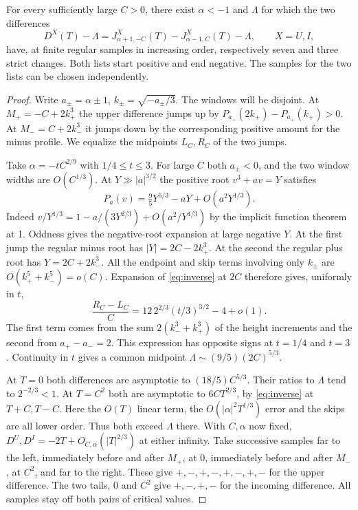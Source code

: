 \begin{lemma}\label{lem:skew-cubic}
For every sufficiently large $C>0$, there exist $\alpha<-1$ and $\Lambda$
for which the two differences
\[
 D^X(T)-\Lambda
 =J^X_{\alpha+1,-C}(T)-J^X_{\alpha-1,C}(T)-\Lambda,\qquad X=U,I,
\]
have, at finite regular samples in increasing order, respectively seven
and three strict changes. Both lists start positive and end negative.
The samples for the two lists can be chosen independently.
\end{lemma}
\begin{proof}
Write $a_\pm=\alpha\pm1$, $k_\pm=\sqrt{-a_\pm/3}$. The windows will be
disjoint. At $M_+=-C+2k_+^3$ the upper difference jumps up by
$P_{a_+}(2k_+)-P_{a_+}(k_+)>0$. At $M_-=C+2k_-^3$ it jumps down by
the corresponding positive amount for the minus profile. We equalize the
midpoints $L_C,R_C$ of the two jumps.

Take $\alpha=-t C^{2/9}$ with $1/4\le t\le3$. For large $C$ both
$a_\pm<0$, and the two window widths are $O(C^{1/3})$. At $Y\gg|a|^{3/2}$
the positive root $v^3+av=Y$ satisfies
\begin{equation}
 P_a(v)=\tfrac95Y^{5/3}-aY+O(a^2Y^{1/3}).                     \label{eq:inverse}
\end{equation}
Indeed $v/Y^{1/3}=1-a/(3Y^{2/3})+O(a^2/Y^{4/3})$ by the implicit
function theorem at 1. Oddness gives the negative-root expansion at
large negative $Y$. At the first jump the regular minus root has
$|Y|=2C-2k_+^3$. At the second the regular plus root has
$Y=2C+2k_-^3$. All the endpoint and skip terms involving only $k_\pm$
are $O(k_+^5+k_-^5)=o(C)$. Expansion of \eqref{eq:inverse} at $2C$
therefore gives, uniformly in $t$,
\[
 \frac{R_C-L_C}{C}=
 12\,2^{2/3}(t/3)^{3/2}-4+o(1).
\]
The first term comes from the sum $2(k_-^3+k_+^3)$ of the height
increments and the second from $a_+-a_-=2$. This expression has opposite
signs at $t=1/4$ and $t=3$. Continuity in $t$ gives a common midpoint
$\Lambda\sim(9/5)(2C)^{5/3}$.

At $T=0$ both differences are asymptotic to $(18/5)C^{5/3}$. Their
ratios to $\Lambda$ tend to $2^{-2/3}<1$.
At $T=C^2$ both are asymptotic to $6CT^{2/3}$, by
\eqref{eq:inverse} at $T+C,T-C$. Here the $O(T)$ linear term, the
$O(|\alpha|^2T^{1/3})$ error and the skips are all lower order.
Thus both exceed $\Lambda$ there. With $C,\alpha$ now fixed,
$D^U,D^I=-2T+O_{C,\alpha}(|T|^{2/3})$ at either infinity.
Take successive samples far to the left, immediately before and after
$M_+$, at 0, immediately before and after $M_-$, at $C^2$, and far
to the right. These give $+,-,+,-,+,-,+,-$ for the upper difference.
The two tails, 0 and $C^2$ give $+,-,+,-$ for the incoming difference.
All samples stay off both pairs of critical values.
\end{proof}

